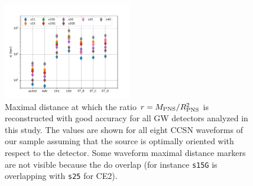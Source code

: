 \begin{figure}[t]
  \centering
  \includegraphics[width=0.5\textwidth]{plots/dist_allwvfs_2G3G}
  \caption{Maximal distance at which the ratio $r=M_{\rm PNS}/R_{\rm PNS}^2$ is reconstructed
    with good accuracy for all GW detectors analyzed in this study. The values are shown for all eight CCSN waveforms of our sample assuming that the source is optimally oriented with respect to the detector. Some waveform maximal distance markers are not visible because the do overlap (for instance \texttt{s15G} is overlapping with \texttt{s25} for CE2).} 
\label{fig:distances}
\end{figure}

